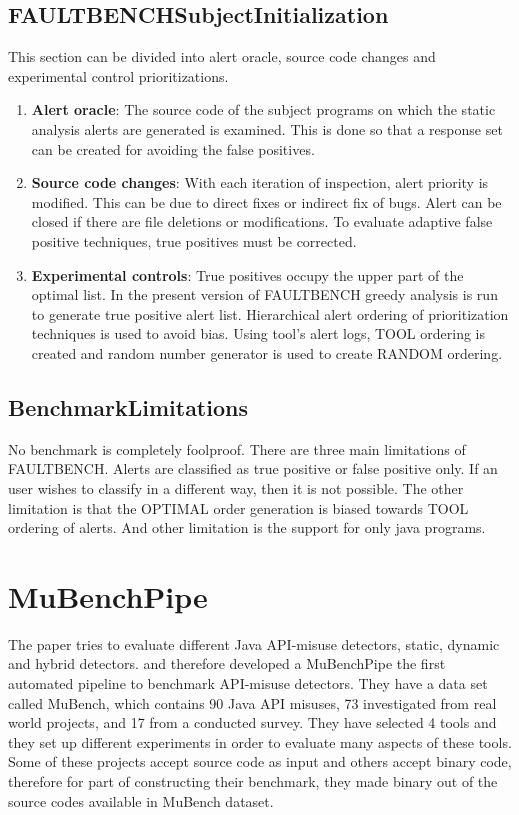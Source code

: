 \documentclass[authoryear,preprint]{sigplanconf}
\begin{document}
\subsection{FAULTBENCHSubjectInitialization}
This section can be divided into alert oracle, source code changes and experimental control prioritizations.
\begin{enumerate}
\item \textbf{Alert oracle}: The source code of the subject programs on which the static analysis alerts are generated is examined. This is done so that a response set can be created for avoiding the false positives.
\item \textbf{Source code changes}: With each iteration of inspection, alert priority is modified. This can be due to direct fixes or indirect fix of bugs. Alert can be closed if there are file deletions or modifications. To evaluate adaptive false positive techniques, true positives must be corrected.
\item \textbf{Experimental controls}: True positives occupy the upper part of the optimal list. In the present version of FAULTBENCH greedy analysis is run to generate true positive alert list. Hierarchical alert ordering of prioritization techniques is used to avoid bias. Using tool's alert logs, TOOL ordering is created and random number generator is used to create RANDOM ordering.
\end{enumerate}

\subsection{BenchmarkLimitations} 
No benchmark is completely foolproof. There are three main limitations of FAULTBENCH. Alerts are classified as true positive or false positive only. If an user wishes to classify in a different way, then it is not possible. The other limitation is that the OPTIMAL order generation is biased towards TOOL ordering of alerts. And other limitation is the support for only java programs.

\section{MuBenchPipe}
\label{sec:sec_mubenchpipe}

The paper tries to evaluate different Java API-misuse detectors, static, dynamic and hybrid detectors. and therefore developed a MuBenchPipe \cite{8338426} the first automated pipeline to benchmark API-misuse detectors. They have a data set called MuBench, which contains 90 Java API misuses, 73 investigated from real world projects, and 17 from a conducted survey. They have selected 4 tools and they set up different experiments in order to evaluate many aspects of these tools. Some of these projects accept source code as input and others accept binary code, therefore for part of constructing their benchmark, they made binary out of the source codes available in MuBench dataset. 
\end{document}
